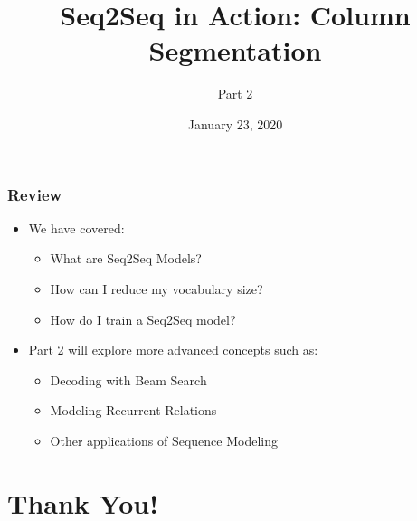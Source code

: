 \documentclass[usenames,dvipsnames]{beamer}
\begin{document}
\begin{frame}
  \frametitle{Review}
  \begin{itemize}
    \item We have covered:
    \begin{itemize}
      \item What are Seq2Seq Models?
      \item How can I reduce my vocabulary size?
      \item How do I train a Seq2Seq model?
    \end{itemize}
    \item Part 2 will explore more advanced concepts such as:
    \begin{itemize}
      \item Decoding with Beam Search
      \item Modeling Recurrent Relations
      \item Other applications of Sequence Modeling
    \end{itemize}
  \end{itemize}
\end{frame}


\section{Thank You!}

\title{Seq2Seq in Action: Column Segmentation}
\subtitle{Part 2}
\date{January 23, 2020}

\begin{frame}
\titlepage
\end{frame}
\end{document}
